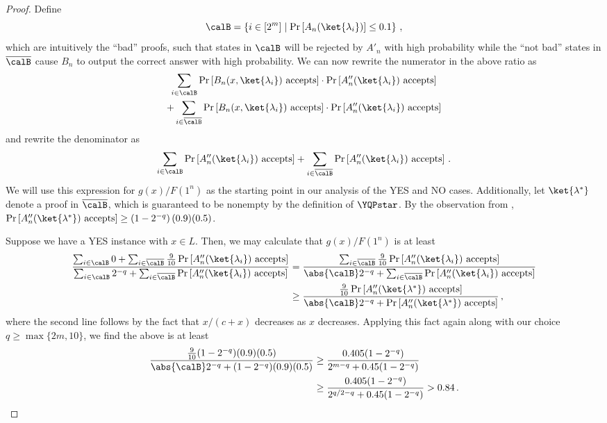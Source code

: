 \begin{proof}
	Define
	\[
	\calB = \left\{ i\in[2^m] \mid \Pr\left[A_n(\ket{\lambda_i})\right]
	\leq 0.1 \right\} \, ,
	\]
	which are intuitively the ``bad'' proofs, such that states in $\calB$ will be rejected
	by $A'_n$ with high probability while the ``not bad'' states in $\overline{\calB}$
	cause $B_n$ to output the correct answer with high probability.
%
%
%
%
%
%
%
%
%
%
%
%
%
%
%
%
%
%
%
%
%
%
%
%
%
%
%
%
%
	We can now rewrite the numerator in the above ratio as
	\begin{multline*}
		\sum_{i\in \calB}
		\Pr\left[B_n(x,\ket{\lambda_i})\text{ accepts}\right]
		\cdot \Pr\left[A''_n(\ket{\lambda_i})\text{ accepts}\right] 
		\\ + 
		\sum_{i\in\overline{\calB}} 
		\Pr\left[B_n(x,\ket{\lambda_i})\text{ accepts}\right]
		\cdot \Pr\left[A''_n(\ket{\lambda_i})\text{ accepts}\right] 
	\end{multline*}
	and rewrite the denominator as
	\[
		\sum_{i\in \calB} \Pr\left[A''_n(\ket{\lambda_i})\text{ accepts}\right]
		+ \sum_{i\in\overline{\calB}} \Pr\left[A''_n(\ket{\lambda_i})\text{ accepts}\right]
		\, .
	\]
	We will use this expression for $g(x)/F(1^n)$ as the starting point in our analysis of the
	YES and NO cases.
	Additionally, let $\ket{\lambda^*}$ denote a proof in $\overline{\calB}$,
	which is guaranteed to be nonempty by the definition of $\YQPstar$.
	By the observation from ,
	$\Pr\left[A''_n(\ket{\lambda^*})\text{ accepts}\right] \geq \left(1-2^{-q}\right) (0.9)(0.5)$.
%
	
	Suppose we have a YES instance with $x\in L$.
	Then, we may calculate that $g(x)/F(1^n)$ is at least
	\begin{align*}
		\frac{
			\sum_{i\in \calB} 0
			+ \sum_{i\in\overline{\calB}} \frac{9}{10}
			\Pr\left[A''_n(\ket{\lambda_i})\text{ accepts}\right]
		}
		{
			\sum_{i\in \calB} 2^{-q}
			+ \sum_{i\in\overline{\calB}}
			\Pr\left[A''_n(\ket{\lambda_i})\text{ accepts}\right]
		}
		&= \frac{
			\sum_{i\in\overline{\calB}} \frac{9}{10}
			\Pr\left[A''_n(\ket{\lambda_i})\text{ accepts}\right]
		}
		{
			\abs{\calB} 2^{-q}
			+ \sum_{i\in\overline{\calB}} \Pr\left[A''_n(\ket{\lambda_i})\text{ accepts}\right]
		} \\
		&\geq \frac{\frac{9}{10} \Pr\left[A''_n(\ket{\lambda^*})\text{ accepts}\right]}
		{ \abs{\calB} 2^{-q} + \Pr\left[A''_n(\ket{\lambda^*})\text{ accepts}\right]} \, ,
	\end{align*}
	where the second line follows by the fact that $x/(c+x)$ decreases as $x$ decreases.
	Applying this fact again along with our choice $q\geq\max\{2m,10\}$, we find
	the above is at least
	\begin{align*}
		\frac{\frac{9}{10}(1-2^{-q}) (0.9)(0.5) }
		{\abs{\calB}2^{-q} + (1-2^{-q}) (0.9)(0.5)}
		&\geq \frac{ 0.405 (1-2^{-q}) }{2^{m-q} + 0.45(1-2^{-q}) } \\
		&\geq \frac{0.405(1-2^{-q}) }{2^{q/2-q} + 0.45(1-2^{-q}) } > 0.84 \, .
	\end{align*}
	

\end{proof}
